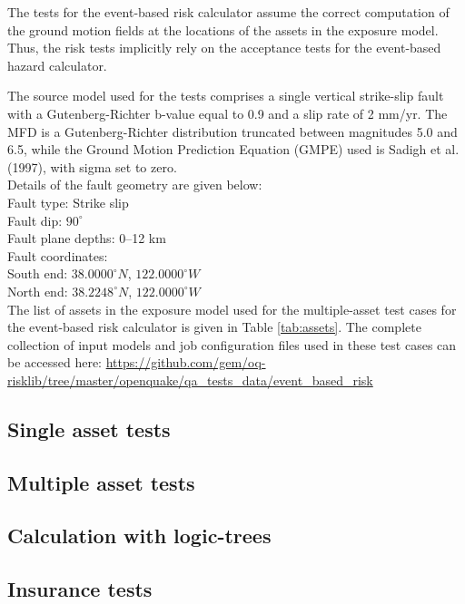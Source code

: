 The tests for the event-based risk calculator assume the correct computation of the ground motion fields at the locations of the assets in the exposure model. Thus, the risk tests implicitly rely on the acceptance tests for the event-based hazard calculator.

The source model used for the tests comprises a single vertical strike-slip fault with a Gutenberg-Richter b-value equal to 0.9 and a slip rate of 2 mm/yr. The MFD is a Gutenberg-Richter distribution truncated between magnitudes 5.0 and 6.5, while the Ground Motion Prediction Equation (GMPE) used is Sadigh et al. (1997), with sigma set to zero.\\

\noindent Details of the fault geometry are given below:\\

\noindent
Fault type: Strike slip\\
Fault dip: $90^{\circ}$\\
Fault plane depths: 0--12 km\\
Fault coordinates:\\
South end: $38.0000^{\circ} N$, $122.0000^{\circ} W$\\
North end: $38.2248^{\circ} N$, $122.0000^{\circ} W$\\



The list of assets in the exposure model used for the multiple-asset test cases for the event-based risk calculator is given in Table \ref{tab:assets}. The complete collection of input models and job configuration files used in these test cases can be accessed here:
\href{https://github.com/gem/oq-risklib/tree/master/openquake/qa_tests_data/event_based_risk}
{https://github.com/gem/oq-risklib/tree/master/openquake/qa\_tests\_data/event\_based\_risk}

\subsection{Single asset tests}
\label{subsec:eventbased-single}


\subsection{Multiple asset tests}
\label{subsec:eventbased-multiple}


\subsection{Calculation with logic-trees}
\label{subsec:eventbased-logictrees}


\subsection{Insurance tests}
\label{subsec:eventbased-insurance}

